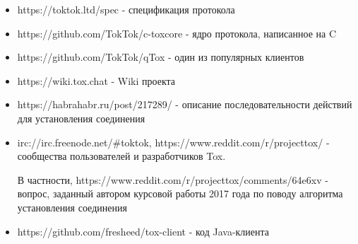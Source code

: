 \documentclass{/home/fresheed/utils/latex/university-templates/lab-report}
\begin{document}
\begin{itemize}
\item https://toktok.ltd/spec - спецификация протокола
\item https://github.com/TokTok/c-toxcore - ядро протокола, написанное на C
\item https://github.com/TokTok/qTox - один из популярных клиентов
\item https://wiki.tox.chat - Wiki проекта
\item https://habrahabr.ru/post/217289/ - описание последовательности действий для установления соединения
\item irc://irc.freenode.net/\#toktok, https://www.reddit.com/r/projecttox/ - сообщества пользователей и разработчиков Tox.

В частности, https://www.reddit.com/r/projecttox/comments/64e6xv - вопрос, заданный автором курсовой работы 2017 года по поводу алгоритма установления соединения
\item https://github.com/fresheed/tox-client - код Java-клиента
\end{itemize}
\end{document}
